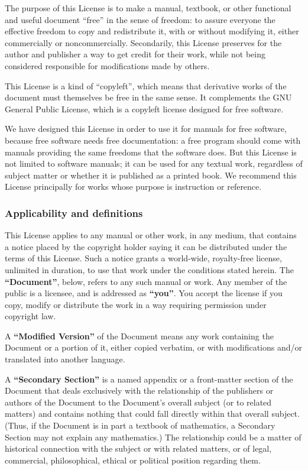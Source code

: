 The purpose of this License is to make a manual, textbook, or other functional and useful document ``free'' in the sense of freedom: to assure everyone the effective freedom to copy and redistribute it, with or without modifying it, either commercially or noncommercially. Secondarily, this License preserves for the author and publisher a way to get credit for their work, while not being considered responsible for modifications made by others.

This License is a kind of ``copyleft'', which means that derivative works of the document must themselves be free in the same sense. It complements the GNU General Public License, which is a copyleft license designed for free software.

We have designed this License in order to use it for manuals for free software, because free software needs free documentation: a free program should come with manuals providing the same freedoms that the software does. But this License is not limited to software manuals; it can be used for any textual work, regardless of subject matter or whether it is published as a printed book. We recommend this License principally for works whose purpose is instruction or reference.

\subsubsection{Applicability and definitions}

This License applies to any manual or other work, in any medium, that contains a notice placed by the copyright holder saying it can be distributed under the terms of this License. Such a notice grants a world-wide, royalty-free license, unlimited in duration, to use that work under the conditions stated herein. The \textbf{``Document''}, below, refers to any such manual or work. Any member of the public is a licensee, and is addressed as \textbf{``you''}. You accept the license if you copy, modify or distribute the work in a way requiring permission under copyright law.

A \textbf{``Modified Version''} of the Document means any work containing the Document or a portion of it, either copied verbatim, or with modifications and/or translated into another language.

A \textbf{``Secondary Section''} is a named appendix or a front-matter section of the Document that deals exclusively with the relationship of the publishers or authors of the Document to the Document's overall subject (or to related matters) and contains nothing that could fall directly within that overall subject. (Thus, if the Document is in part a textbook of mathematics, a Secondary Section may not explain any mathematics.)  The relationship could be a matter of historical connection with the subject or with related matters, or of legal, commercial, philosophical, ethical or political position regarding them.

